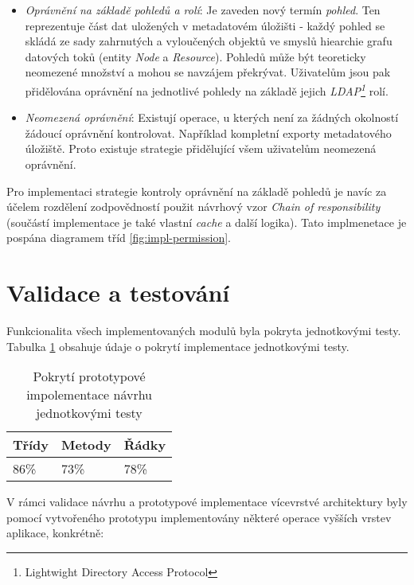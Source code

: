 \begin{itemize}
   \item{\textit{Oprávnění na základě pohledů a rolí}}: Je zaveden nový termín \textit{pohled}. Ten reprezentuje část dat uložených v metadatovém úložišti - každý pohled se skládá ze sady zahrnutých a vyloučených objektů ve smyslů hiearchie grafu datových toků (entity \textit{Node} a \textit{Resource}). Pohledů může být teoreticky neomezené množství a mohou se navzájem překrývat. Uživatelům jsou pak přidělována oprávnění na jednotlivé pohledy na základě jejich \textit{LDAP\footnote{Lightwight Directory Access Protocol}} rolí.

   \item{\textit{Neomezená oprávnění}}: Existují operace, u kterých není za žádných okolností žádoucí oprávnění kontrolovat. Například kompletní exporty metadatového úložiště. Proto existuje strategie přidělující všem uživatelům neomezená oprávnění.
\end{itemize}

Pro implementaci strategie kontroly oprávnění na základě pohledů je navíc za účelem rozdělení zodpovědností použit návrhový vzor \textit{Chain of responsibility} (součástí implementace je také vlastní \textit{cache} a další logika). Tato implmenetace je pospána diagramem tříd \ref{fig:impl-permission}.


\section{Validace a testování}
Funkcionalita všech implementovaných modulů byla pokryta jednotkovými testy. Tabulka \ref{tab:coverage} obsahuje údaje o pokrytí implementace jednotkovými testy.

\begin{table}[h!]
\begin{center}
\centering
\caption{Pokrytí prototypové impolementace návrhu jednotkovými testy}
\label{tab:coverage}
\begin{tabular}{|p{4cm}|p{4cm}|p{4cm}|}
	\hline
    Třídy & Metody & Řádky \\ \hline
	 86\% &	73\% &	78\% \\ \hline
 \end{tabular}
 \end{center}
 \end{table}

V rámci validace návrhu a prototypové implementace vícevrstvé architektury byly pomocí vytvořeného prototypu implementovány některé operace vyšších vrstev aplikace, konkrétně:

